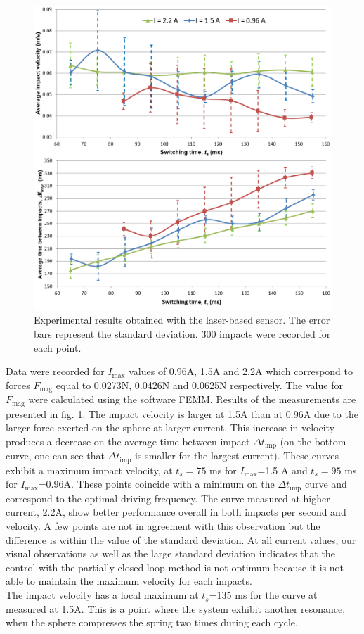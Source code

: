 \documentclass[letterpaper, 10 pt, conference]{ieeeconf}  %
\begin{document}
\begin{figure}
  \includegraphics[width=\linewidth]{laser_exp.png}
  \caption{Experimental results obtained with the laser-based sensor. The error bars represent the standard deviation. 300 impacts were recorded for each point.}
  \label{laser_exp}
	\vspace{-2em}
\end{figure}

Data were recorded for $I_{\textrm{max}}$ values of 0.96A, 1.5A and 2.2A which correspond to forces $F_{\textrm{mag}}$ equal to 0.0273N, 0.0426N and 0.0625N respectively. The value for $F_{\textrm{mag}}$ were calculated using the software FEMM. Results of the measurements are presented in fig. \ref{laser_exp}. The impact velocity is larger at 1.5A than at 0.96A due to the larger force exerted on the sphere at larger current. This increase in velocity produces a decrease on the average time between impact $\Delta t_{\textrm{imp}}$ (on the bottom curve, one can see that $\Delta t_{\textrm{imp}}$ is smaller for the largest current). These curves exhibit a maximum impact velocity, at $t_s=75$ ms for $I_{\textrm{max}}$=1.5 A and $t_s=95$ ms for $I_{\textrm{max}}$=0.96A. These points coincide with a minimum on the $\Delta t_{\textrm{imp}}$ curve and correspond to the optimal driving frequency. The curve measured at higher current, 2.2A, show better performance overall in both impacts per second and velocity. A few points are not in agreement with this observation but the difference is within the value of the standard deviation. At all current values, our visual observations as well as the large standard deviation indicates that the control with the partially closed-loop method is not optimum because it is not able to maintain the maximum velocity for each impacts.\\
The impact velocity has a local maximum at $t_s$=135 ms for the curve at measured at 1.5A. This is a point where the system exhibit another resonance, when the sphere compresses the spring two times during each cycle.
\end{document}
